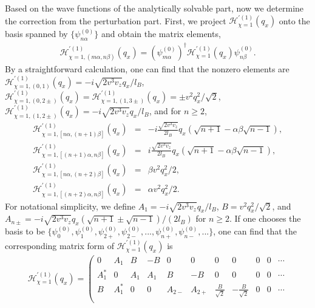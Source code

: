 \documentclass[aps,prl,twocolumn,longbibliography]{revtex4-1}
\begin{document}
\begin{widetext}
Based on the wave functions of the analytically solvable part, now we determine the
correction from the perturbation part. First, we project $\mathcal{H}_{\chi=1}^{'(1)}(q_{x})$ onto
the basis spanned by $\{\psi_{n\alpha}^{(0)}\}$ and obtain the matrix elements,
\begin{eqnarray}
\mathcal{H}_{\chi=1,(m\alpha,n\beta)}^{'(1)}(q_{x})=(\psi_{m\alpha}^{(0)})^{\dagger}\mathcal{H}_{\chi=1}^{'(1)}(q_{x})\psi_{n\beta}^{(0)}.
\end{eqnarray}
By a straightforward calculation,
one can find that the
nonzero elements are
$\mathcal{H}_{\chi=1,(0,1)}^{'(1)}(q_{x})=-i \sqrt{2v^{3}v_{z}}q_{x}/l_{B}$,
$\mathcal{H}_{\chi=1,(0,2\pm)}^{'(1)}(q_{x})=\mathcal{H}_{\chi=1,(1,3\pm)}^{'(1)}(q_{x})=\pm v^{2}q_{x}^{2}/\sqrt{2}$,
$\mathcal{H}_{\chi=1,(1,2\pm)}^{'(1)}(q_{x})=-i\sqrt{2v^{3}v_{z}}q_{x}/l_{B}$,
and for $n\geq2$,
\begin{eqnarray}
\mathcal{H}_{\chi=1,[n\alpha,(n+1)\beta]}^{'(1)}(q_{x})&=&-i\frac{\sqrt{2v^{3}v_{z}}}{2l_{B}}q_{x}(\sqrt{n+1}
-\alpha\beta\sqrt{n-1}),\nonumber\\
\mathcal{H}_{\chi=1,[(n+1)\alpha,n\beta]}^{'(1)}(q_{x})&=&i\frac{\sqrt{2v^{3}v_{z}}}{2l_{B}}q_{x}(\sqrt{n+1}
-\alpha\beta\sqrt{n-1}),\nonumber\\
\mathcal{H}_{\chi=1,[n\alpha,(n+2)\beta]}^{'(1)}(q_{x})&=&\beta v^{2}q_{x}^{2}/2,\nonumber\\
\mathcal{H}_{\chi=1,[(n+2)\alpha,n\beta]}^{'(1)}(q_{x})&=&\alpha v^{2}q_{x}^{2}/2.
\end{eqnarray}
For notational simplicity, we define $A_{1}=-i \sqrt{2v^{3}v_{z}}q_{x}/l_{B}$, $B=v^{2}q_{x}^{2}/\sqrt{2}$,
and $A_{n\pm}=-i\sqrt{2v^{3}v_{z}}q_{x}(\sqrt{n+1}
\pm\sqrt{n-1})/(2l_{B})$ for $n\geq2$. If one
chooses the basis to be $\{\psi_{0}^{(0)},\psi_{1}^{(0)},\psi_{2+}^{(0)},\psi_{2-}^{(0)},...,\psi_{n+}^{(0)},\psi_{n-}^{(0)},...\}$,
one can find that the corresponding matrix form of $\mathcal{H}_{\chi=1}^{'(1)}(q_{x})$ is
\begin{eqnarray}
\mathcal{H}_{\chi=1}^{'(1)}(q_{x})=\left(
                                     \begin{array}{ccccccccccc}
                                       0 & A_{1} & B & -B & 0 & 0 & 0 & 0 & 0 & 0 & \cdots \\
                                       A_{1}^{*} & 0 & A_{1} & A_{1} & B & -B & 0 & 0 & 0 & 0 & \cdots \\
                                       B & A_{1}^{*} & 0 & 0 & A_{2-} & A_{2+} & \frac{B}{\sqrt{2}} & -\frac{B}{\sqrt{2}} & 0 & 0 & \cdots \\

\end{array}
\end{eqnarray}
\end{widetext}
\end{document}
